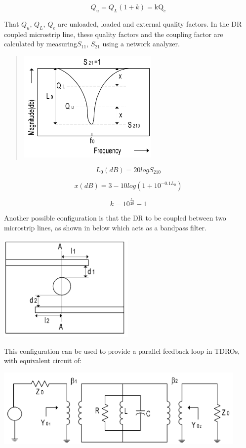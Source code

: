 \[Q_{u} = Q_{L}(1 + k) = \text{kQ}_{e}\]

That \(Q_{u}\), \(Q_{L}\), \(Q_{e}\) are unloaded, loaded and external
quality factors. In the DR coupled microstrip line, these quality
factors and the coupling factor are calculated by measuring\(S_{11}\),
\(S_{21}\) using a network analyzer.

\begin{quote}
\includegraphics[width=2.68056in,height=2.15278in]{media/image4.png}
\end{quote}

\[L_{0}(dB) = 20logS_{210}\]

\[x(dB) = 3 - 10log(1 + 10^{- 0.1L_{0}})\]

\[k = 10^{\frac{L_{0}}{20}} - 1\]

Another possible configuration is that the DR to be coupled between two
microstrip lines, as shown in below which acts as a bandpass filter.

\includegraphics[width=2.61458in,height=2.05764in]{media/image5.png}

This configuration can be used to provide a parallel feedback loop in
TDROs, with equivalent circuit of:

\includegraphics[width=4.83333in,height=1.51597in]{media/image6.png}

